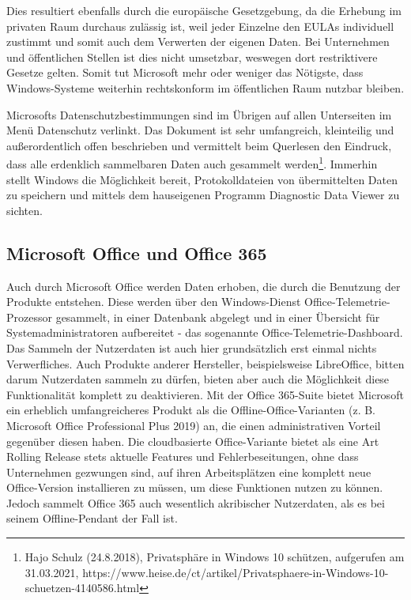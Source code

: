 Dies resultiert ebenfalls durch die europäische Gesetzgebung, da die Erhebung im privaten Raum durchaus zulässig ist, weil jeder Einzelne den EULAs individuell zustimmt und somit auch dem Verwerten der eigenen Daten. Bei Unternehmen und öffentlichen Stellen ist dies nicht umsetzbar, weswegen dort restriktivere Gesetze gelten. Somit tut Microsoft mehr oder weniger das Nötigste, dass Windows-Systeme weiterhin rechtskonform im öffentlichen Raum nutzbar bleiben.

Microsofts Datenschutzbestimmungen sind im Übrigen auf allen Unterseiten im Menü \glqq Datenschutz\grqq{} verlinkt. Das Dokument ist sehr umfangreich, kleinteilig und außerordentlich offen beschrieben und vermittelt beim Querlesen den Eindruck, dass alle erdenklich sammelbaren Daten auch gesammelt werden\footnote{Hajo Schulz (24.8.2018), Privatsphäre in Windows 10 schützen, aufgerufen am 31.03.2021, https://www.heise.de/ct/artikel/Privatsphaere-in-Windows-10-schuetzen-4140586.html}. Immerhin stellt Windows die Möglichkeit bereit, Protokolldateien von übermittelten Daten zu speichern und mittels dem hauseigenen Programm \glqq Diagnostic Data Viewer\grqq{} zu sichten.

\subsection{Microsoft Office und Office 365}
Auch durch Microsoft Office werden Daten erhoben, die durch die Benutzung der Produkte entstehen. Diese werden über den Windows-Dienst \glqq Office-Telemetrie-Prozessor\grqq{} gesammelt, in einer Datenbank abgelegt und in einer Übersicht für Systemadministratoren aufbereitet - das sogenannte \glqq Office-Telemetrie-Dashboard\grqq{}.\\
Das Sammeln der Nutzerdaten ist auch hier grundsätzlich erst einmal nichts Verwerfliches. Auch Produkte anderer Hersteller, beispielsweise LibreOffice, bitten darum Nutzerdaten sammeln zu dürfen, bieten aber auch die Möglichkeit diese Funktionalität komplett zu deaktivieren. Mit der \glqq Office 365\grqq{}-Suite bietet Microsoft ein erheblich umfangreicheres Produkt als die Offline-Office-Varianten (z. B. Microsoft Office Professional Plus 2019) an, die einen administrativen Vorteil gegenüber diesen haben. Die cloudbasierte Office-Variante bietet als eine Art \glqq Rolling Release\grqq{} stets aktuelle Features und Fehlerbeseitungen, ohne dass Unternehmen gezwungen sind, auf ihren Arbeitsplätzen eine komplett neue Office-Version installieren zu müssen, um diese Funktionen nutzen zu können. Jedoch sammelt Office 365 auch wesentlich akribischer Nutzerdaten, als es bei seinem Offline-Pendant der Fall ist.

